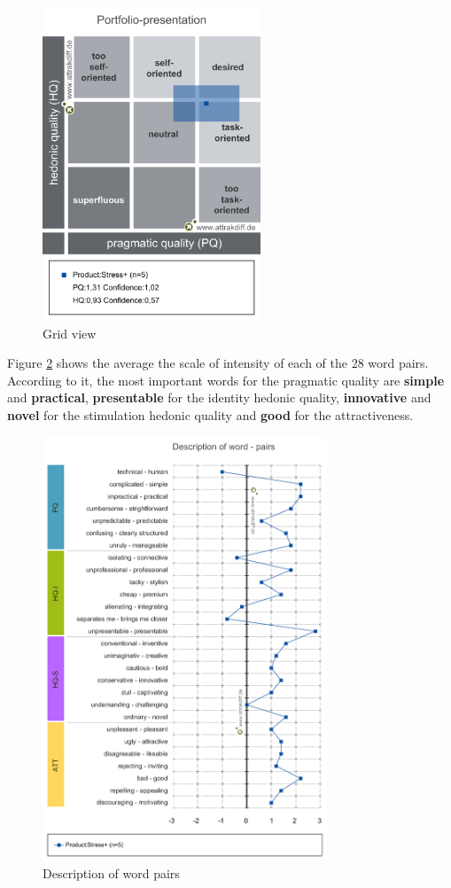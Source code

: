\documentclass[conference]{IEEEtran}
\begin{document}
\begin{figure}[t!]
\centering
\includegraphics[width=6.5cm]{AttrakDiff/Portfolio of results.png}
\caption{\label{figure-grid}Grid view}
\end{figure}

Figure \ref{figure-word-pairs} shows the average the scale of intensity of each of
the 28 word pairs. According to it, the most important words for the pragmatic
quality are \textbf{simple} and \textbf{practical}, \textbf{presentable} for the identity hedonic
quality, \textbf{innovative} and \textbf{novel} for the stimulation hedonic quality and \textbf{good}
for the attractiveness.

\begin{figure}[t!]
\centering
\includegraphics[width=8.5cm]{AttrakDiff/Description of word-pairs.png}
\caption{\label{figure-word-pairs}Description of word pairs}
\end{figure}
\end{document}
